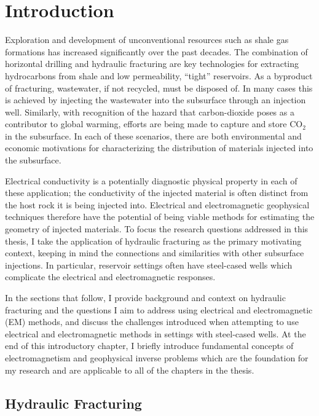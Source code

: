 
\chapter{Introduction}
\label{ch:introduction}

Exploration and development of unconventional resources such as shale gas formations has increased significantly over the past decades. The combination of horizontal drilling and hydraulic fracturing are key technologies for extracting hydrocarbons from shale and low permeability, ``tight'' reservoirs. As a byproduct of fracturing, wastewater, if not recycled, must be disposed of. In many cases this is achieved by injecting the wastewater into the subsurface through an injection well. Similarly, with recognition of the hazard that carbon-dioxide poses as a contributor to global warming, efforts are being made to capture and store CO$_2$ in the subsurface. In each of these scenarios, there are both environmental and economic motivations for characterizing the distribution of materials injected into the subsurface.

Electrical conductivity is a potentially diagnostic physical property in each of these application; the conductivity of the injected material is often distinct from the host rock it is being injected into. Electrical and electromagnetic geophysical techniques therefore have the potential of being viable methods for estimating the geometry of injected materials. To focus the research questions addressed in this thesis, I take the application of hydraulic fracturing as the primary motivating context, keeping in mind the connections and similarities with other subsurface injections. In particular, reservoir settings often have steel-cased wells which complicate the electrical and electromagnetic responses.

In the sections that follow, I provide background and context on hydraulic fracturing and the questions I aim to address using electrical and electromagnetic (EM) methods, and discuss the challenges introduced when attempting to use electrical and electromagnetic methods in settings with steel-cased wells. At the end of this introductory chapter, I briefly introduce fundamental concepts of electromagnetism and geophysical inverse problems which are the foundation for my research and are applicable to all of the chapters in the thesis.

\section{Hydraulic Fracturing}
\label{sec:hydraulic-fracturing}

